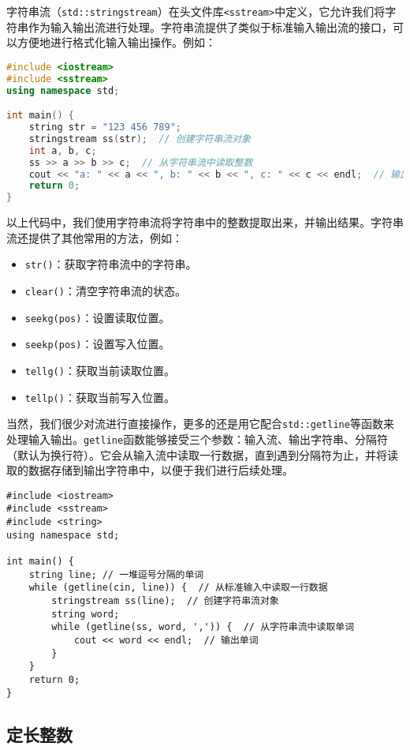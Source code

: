 字符串流（\texttt{std::stringstream}）在头文件库\texttt{<sstream>}中定义，它允许我们将字符串作为输入输出流进行处理。字符串流提供了类似于标准输入输出流的接口，可以方便地进行格式化输入输出操作。例如：
\begin{lstlisting}[language=C++]
#include <iostream>
#include <sstream>
using namespace std;

int main() {
    string str = "123 456 789";
    stringstream ss(str);  // 创建字符串流对象
    int a, b, c;
    ss >> a >> b >> c;  // 从字符串流中读取整数
    cout << "a: " << a << ", b: " << b << ", c: " << c << endl;  // 输出结果
    return 0;
}
\end{lstlisting}
以上代码中，我们使用字符串流将字符串中的整数提取出来，并输出结果。字符串流还提供了其他常用的方法，例如：
\begin{itemize}
  \item \texttt{str()}：获取字符串流中的字符串。
  \item \texttt{clear()}：清空字符串流的状态。
  \item \texttt{seekg(pos)}：设置读取位置。
  \item \texttt{seekp(pos)}：设置写入位置。
  \item \texttt{tellg()}：获取当前读取位置。
  \item \texttt{tellp()}：获取当前写入位置。
\end{itemize}
当然，我们很少对流进行直接操作，更多的还是用它配合\texttt{std::getline}等函数来处理输入输出。\texttt{getline}函数能够接受三个参数：输入流、输出字符串、分隔符（默认为换行符）。它会从输入流中读取一行数据，直到遇到分隔符为止，并将读取的数据存储到输出字符串中，以便于我们进行后续处理。
\begin{lstlisting}
#include <iostream>
#include <sstream>
#include <string>
using namespace std;

int main() {
    string line; // 一堆逗号分隔的单词
    while (getline(cin, line)) {  // 从标准输入中读取一行数据
        stringstream ss(line);  // 创建字符串流对象
        string word;
        while (getline(ss, word, ',')) {  // 从字符串流中读取单词
            cout << word << endl;  // 输出单词
        }
    }
    return 0;
}
\end{lstlisting}

\subsection{定长整数}

